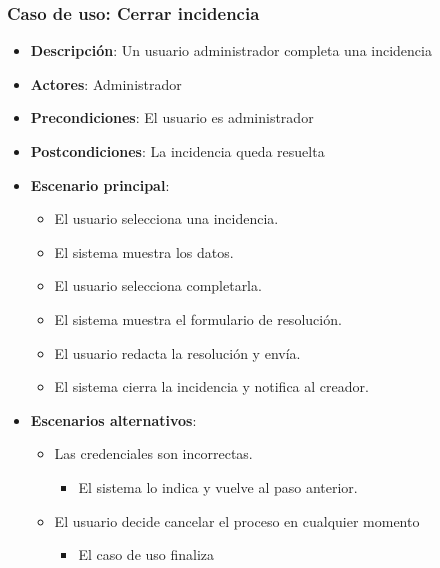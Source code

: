 \documentclass[12pt,a4paperpaper,]{report}
\providecommand{\tightlist}{%
  \setlength{\itemsep}{0pt}\setlength{\parskip}{0pt}}
\begin{document}
\subsubsection{Caso de uso: Cerrar
incidencia}\label{caso-de-uso-cerrar-incidencia}

\begin{itemize}
\tightlist
\item
  \textbf{Descripción}: Un usuario administrador completa una incidencia
\item
  \textbf{Actores}: Administrador
\item
  \textbf{Precondiciones}: El usuario es administrador
\item
  \textbf{Postcondiciones}: La incidencia queda resuelta
\item
  \textbf{Escenario principal}:

  \begin{itemize}
  \tightlist
  \item
    El usuario selecciona una incidencia.
  \item
    El sistema muestra los datos.
  \item
    El usuario selecciona completarla.
  \item
    El sistema muestra el formulario de resolución.
  \item
    El usuario redacta la resolución y envía.
  \item
    El sistema cierra la incidencia y notifica al creador.
  \end{itemize}
\item
  \textbf{Escenarios alternativos}:

  \begin{itemize}
  \tightlist
  \item
    Las credenciales son incorrectas.

    \begin{itemize}
    \tightlist
    \item
      El sistema lo indica y vuelve al paso anterior.
    \end{itemize}
  \item
    El usuario decide cancelar el proceso en cualquier momento

    \begin{itemize}
    \tightlist
    \item
      El caso de uso finaliza
    \end{itemize}
  \end{itemize}
\end{itemize}
\end{document}
